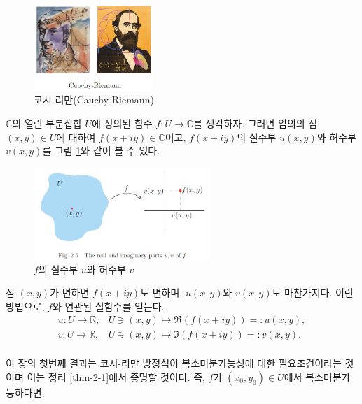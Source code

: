 \begin{figure}[!h]
\begin{center}
\includegraphics[width=0.4\textwidth]{./SaltChapter/fig-2-0-1} \\
{코시-리만(Cauchy-Riemann)}
\end{center}
\end{figure}


$\mathbb C$의 열린 부분집합 $U$에 정의된
함수 $f:U\to \mathbb C$를 생각하자.
그러면 임의의 점 $(x,y)\in U$에 대하여 $f(x+iy)\in\mathbb C$이고,
$f(x+iy)$의 실수부 $u(x,y)$와 허수부 $v(x,y)$를 그림 \ref{fig-2-5}와 같이 볼 수 있다.

\begin{figure}[!h]
\begin{center}
\includegraphics[width=0.6\textwidth]{./SaltChapter/fig-2-5}
\end{center}
\caption{$f$의 실수부 $u$와 허수부 $v$}
\label{fig-2-5}
\end{figure}

점 $(x,y)$가 변하면 $f(x+iy)$도 변하며, $u(x,y)$와 $v(x,y)$도 마찬가지다.
이런 방법으로, $f$와 연관된 실함수를 얻는다.
\begin{align*}
u:U\to \mathbb R, & U \ni (x,y) \mapsto \Re(f(x+iy)) =: u(x,y), \\
v:U\to \mathbb R, & U \ni (x,y) \mapsto \Im(f(x+iy)) =: v(x,y). \\
\end{align*}

이 장의 첫번째 결과는 코시-리만 방정식이 복소미분가능성에 대한 필요조건이라는 것이며
이는 정리 \ref{thm-2-1}에서 증명할 것이다. 
즉, $f$가 $(x_0, y_0) \in U$에서 복소미분가능하다면,

